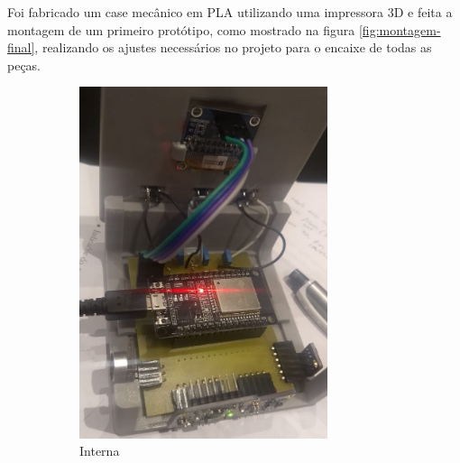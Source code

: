 \documentclass[../monografia.tex]{subfiles}
\begin{document}

Foi fabricado um case mecânico em PLA utilizando uma impressora 3D e feita a montagem de um primeiro protótipo, como mostrado na figura \ref{fig:montagem-final}, realizando os ajustes necessários no projeto para o encaixe de todas as peças. 

\begin{figure}[h]
	\centering
	\begin{subfigure}{0.5\textwidth}
		\centering
		\includegraphics[width=0.8\textwidth]{placa-final}
		\caption{Interna}
		\label{fig:interna}
	\end{subfigure}%
	\begin{subfigure}{0.5\textwidth}
		\centering

\end{subfigure}
\end{figure}
\end{document}
